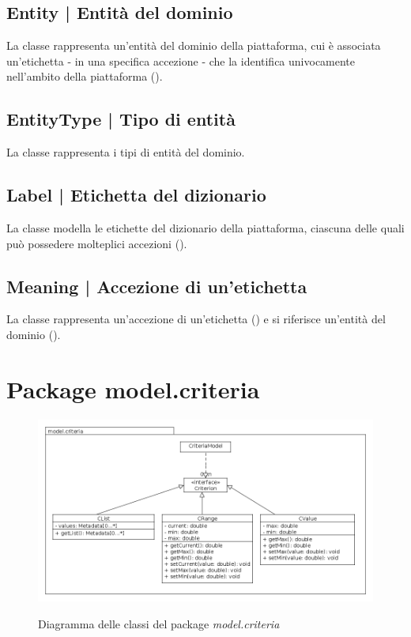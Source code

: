 \documentclass[10pt,a4paper,headinclude,footinclude,hidelinks]{scrreprt} %
\begin{document}
	\subsection[Entity]{Entity | Entità del dominio}
	\label{sec:stage:design:model:entity}
	La classe \textit{} rappresenta un'entità del dominio della piattaforma, cui è associata un'etichetta - in una specifica accezione - che la identifica univocamente nell'ambito della piattaforma (\textit{}).

	\subsection[EntityType]{EntityType | Tipo di entità}
	\label{sec:stage:design:model:entity-type}
	La classe \textit{} rappresenta i tipi di entità del dominio.

	\subsection[Label]{Label | Etichetta del dizionario}
	\label{sec:stage:design:model:label}
	La classe \textit{} modella le etichette del dizionario della piattaforma, ciascuna delle quali può possedere molteplici accezioni (\textit{}).

	\subsection[Meaning]{Meaning | Accezione di un'etichetta}
	\label{sec:stage:design:model:meaning}
	La classe \textit{} rappresenta un'accezione di un'etichetta (\textit{}) e si riferisce un'entità del dominio (\textit{}).

	\section{Package model.criteria}
	\label{sec:stage:design:model.criteria}

	\begin{figure}[ht]
		\begin{center}
	    	\includegraphics[width=12cm]{class/model_criteria.png}
			\label{gfx:class:model:criteria}
			\caption{Diagramma delle classi del package \textit{model.criteria}}
		\end{center}
	\end{figure}
\end{document}
